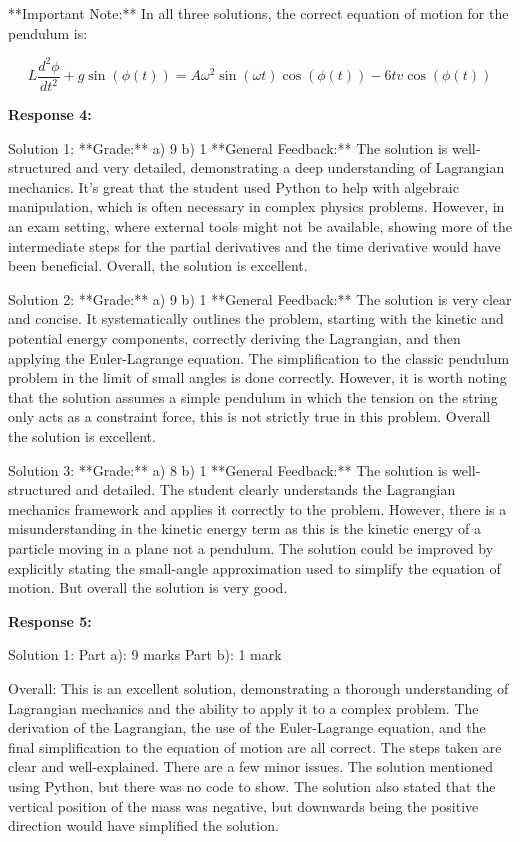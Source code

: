 \documentclass[a4paper,11pt]{article}
\begin{document}
**Important Note:** In all three solutions, the correct equation of motion for the pendulum is:

\[ L\frac{d^2\phi}{dt^2} + g\sin(\phi(t)) = A\omega^2\sin(\omega t)\cos(\phi(t)) - 6tv\cos(\phi(t)) \]

\bigskip    
\textbf{Response 4:}

Solution 1:
**Grade:**
a) 9
b) 1
**General Feedback:** 
The solution is well-structured and very detailed, demonstrating a deep understanding of Lagrangian mechanics. It's great that the student used Python to help with algebraic manipulation, which is often necessary in complex physics problems. However, in an exam setting, where external tools might not be available, showing more of the intermediate steps for the partial derivatives and the time derivative would have been beneficial. Overall, the solution is excellent.

Solution 2: 
**Grade:**
a) 9
b) 1
**General Feedback:** 
The solution is very clear and concise. It systematically outlines the problem, starting with the kinetic and potential energy components, correctly deriving the Lagrangian, and then applying the Euler-Lagrange equation. The simplification to the classic pendulum problem in the limit of small angles is done correctly. However, it is worth noting that the solution assumes a simple pendulum in which the tension on the string only acts as a constraint force, this is not strictly true in this problem. Overall the solution is excellent.

Solution 3: 
**Grade:**
a) 8
b) 1
**General Feedback:**
The solution is well-structured and detailed. The student clearly understands the Lagrangian mechanics framework and applies it correctly to the problem. However, there is a misunderstanding in the kinetic energy term as this is the kinetic energy of a particle moving in a plane not a pendulum. The solution could be improved by explicitly stating the small-angle approximation used to simplify the equation of motion. But overall the solution is very good.

\bigskip    
\textbf{Response 5:}

Solution 1:
Part a): 9 marks
Part b): 1 mark

Overall: This is an excellent solution, demonstrating a thorough understanding of Lagrangian mechanics and the ability to apply it to a complex problem. The derivation of the Lagrangian, the use of the Euler-Lagrange equation, and the final simplification to the equation of motion are all correct. The steps taken are clear and well-explained. There are a few minor issues. The solution mentioned using Python, but there was no code to show. The solution also stated that the vertical position of the mass was negative, but downwards being the positive direction would have simplified the solution.
\end{document}
